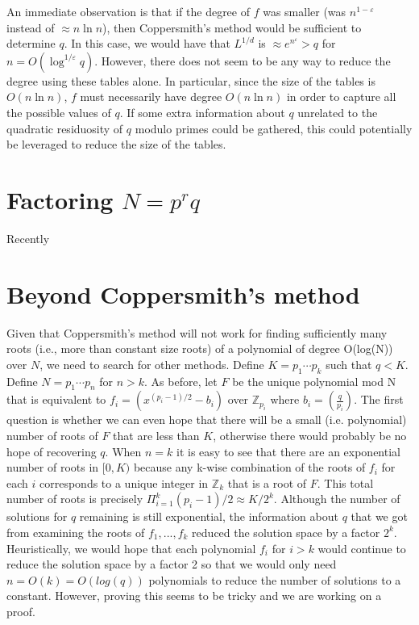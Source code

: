 \documentclass[letterpaper,twocolumn,10pt]{article}
\begin{document}
An immediate observation is that if the degree of $f$ was smaller (was $n^{1 - \varepsilon}$ instead of $\approx n \ln n$), then Coppersmith's method would be sufficient to determine $q$. In this case, we would have that $L^{1/d}$ is $\approx e^{n^{\varepsilon}} > q$ for $n = O(\log^{1/\varepsilon} q)$. However, there does not seem to be any way to reduce the degree using these tables alone. In particular, since the size of the tables is $O(n \ln n)$, $f$ must necessarily have degree $O(n \ln n)$ in order to capture all the possible values of $q$. If some extra information about $q$ unrelated to the quadratic residuosity of $q$ modulo primes could be gathered, this could potentially be leveraged to reduce the size of the tables. 

\section{Factoring $N = p^rq$}

Recently\cite{dan}\cite{pomerance}

\section{Beyond Coppersmith's method} 
Given that Coppersmith's method will not work for finding sufficiently many roots (i.e., more than constant size roots) of a polynomial of degree O(log(N)) over $N$, we need to search for other methods. Define $K = p_1 \cdots p_k$ such that $q < K$. Define $N = p_1 \cdots p_n$ for $n > k$. As before, let $F$ be the unique polynomial mod N that is equivalent to $f_i = (x^{(p_i - 1)/2} - b_i)$ over $\mathbb{Z}_{p_i}$ where $b_i =  \left(\frac{q}{p_i}\right)$. The first question is whether we can even hope that there will be a small (i.e. polynomial) number of roots of $F$ that are less than $K$, otherwise there would probably be no hope of recovering $q$. When $n = k$ it is easy to see that there are an exponential number of roots in $[0, K)$ because any k-wise combination of the roots of $f_i$ for each $i$ corresponds to a unique integer in $\mathbb{Z}_k$ that is a root of $F$. This total number of roots is precisely $\Pi_{i= 1}^k (p_i - 1)/2 \approx K/2^k$. Although the number of solutions for $q$ remaining is still exponential, the information about $q$ that we got from examining the roots of $f_1,...,f_k$ reduced the solution space by a factor $2^k$. Heuristically, we would hope that each polynomial $f_i$ for $i > k$ would continue to reduce the solution space by a factor 2 so that we would only need $n = O(k) = O(log(q))$ polynomials to reduce the number of solutions to a constant. However, proving this seems to be tricky and we are working on a proof. 
\end{document}
